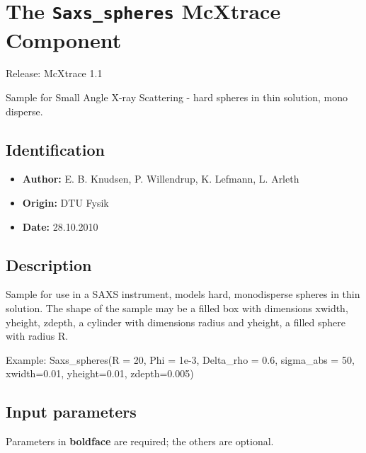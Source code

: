 \section{The \texttt{Saxs\_spheres} McXtrace Component}
Release: McXtrace 1.1

Sample for Small Angle X-ray Scattering - hard spheres in thin solution, mono disperse.

\subsection*{Identification}
\begin{itemize}
  \item \textbf{Author:} E. B. Knudsen, P. Willendrup, K. Lefmann, L. Arleth
  \item \textbf{Origin:} DTU Fysik
  \item \textbf{Date:} 28.10.2010
\end{itemize}

\subsection*{Description}
Sample for use in a SAXS instrument, models hard, monodisperse spheres in thin solution. The shape of the sample may be a filled box with dimensions xwidth, yheight, zdepth, a cylinder with dimensions radius and yheight, a filled sphere with radius R.

Example: Saxs\_spheres(R = 20, Phi = 1e-3, Delta\_rho = 0.6, sigma\_abs = 50, xwidth=0.01, yheight=0.01, zdepth=0.005)

\subsection*{Input parameters}
Parameters in \textbf{boldface} are required; the others are optional.

